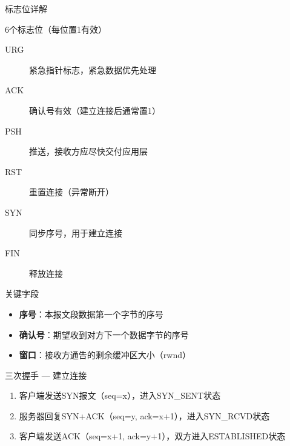 \documentclass[10pt, aspectratio=169]{beamer}
\begin{document}
\begin{frame}{标志位详解}
    \begin{block}{6个标志位（每位置1有效）}
        \begin{description}
            \item[URG] 紧急指针标志，紧急数据优先处理
            \item[ACK] 确认号有效（建立连接后通常置1）
            \item[PSH] 推送，接收方应尽快交付应用层
            \item[RST] 重置连接（异常断开）
            \item[SYN] 同步序号，用于建立连接
            \item[FIN] 释放连接
        \end{description}
    \end{block}
    \vspace{0.5em}
    \begin{exampleblock}{关键字段}
        \begin{itemize}
            \item \textbf{序号}：本报文段数据第一个字节的序号
            \item \textbf{确认号}：期望收到对方下一个数据字节的序号
            \item \textbf{窗口}：接收方通告的剩余缓冲区大小（rwnd）
        \end{itemize}
    \end{exampleblock}
\end{frame}

\begin{frame}{三次握手 --- 建立连接}
    \begin{center}
    \end{center}
    \vspace{0.3em}
    \begin{enumerate}
        \item 客户端发送SYN报文（seq=x），进入SYN\_SENT状态
        \item 服务器回复SYN+ACK（seq=y, ack=x+1），进入SYN\_RCVD状态
        \item 客户端发送ACK（seq=x+1, ack=y+1），双方进入ESTABLISHED状态
    \end{enumerate}
\end{frame}
\end{document}
